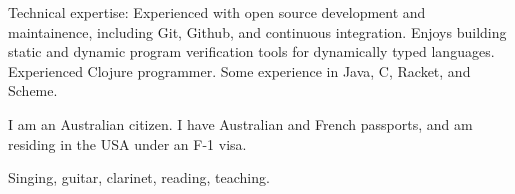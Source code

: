 \documentclass[10pt,a4paper]{article}
\begin{document}

\inlineheadsection  %
  {Technical expertise:}
  {Experienced with open source development and maintainence, 
    including Git, Github, and continuous integration.
    Enjoys building static and dynamic
    program verification tools for dynamically typed languages.
    Experienced Clojure programmer.
    Some experience in Java, C, Racket, and Scheme.
  }


{\bodytext
  {I am an Australian citizen. I have Australian and French
   passports, and am residing in the USA under an F-1 visa.}
}

{\bodytext
  {Singing, guitar, clarinet, reading, teaching.}
}
\end{document}
